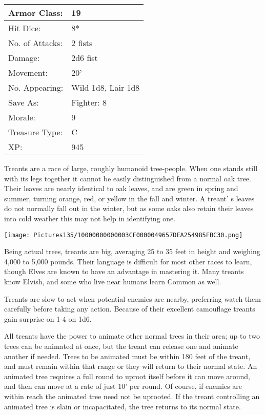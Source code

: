 \documentclass[a4paper,twoside,openany,10pt]{book}
\begin{document}
\begin{multicols}{2}
\begin{tabularx}{0.50\textwidth}{@{}lX@{}}
Armor Class: & 19 \\\hline
Hit Dice: & 8* \\\hline
No. of Attacks: & 2 fists \\\hline
Damage: & 2d6 fist \\\hline
Movement: & 20' \\\hline
No. Appearing: & Wild 1d8, Lair 1d8 \\\hline
Save As: & Fighter: 8 \\\hline
Morale: & 9 \\\hline
Treasure Type: & C \\\hline
XP: & 945 \\\hline
\end{tabularx}\medskip

Treants are a race of large, roughly humanoid tree-people. When one stands still with its legs together it cannot be easily distinguished from a normal oak tree. Their leaves are nearly identical to oak leaves, and are green in spring and summer, turning orange, red, or yellow in the fall and winter. A treant' s leaves do not normally fall out in the winter, but as some oaks also retain their leaves into cold weather this may not help in identifying one.

\begin{center} \texttt{[image: Pictures135/10000000000003CF0000049657DEA254985FBC30.png]} \end{center}

Being actual trees, treants are big, averaging 25 to 35 feet in height and weighing 4,000 to 5,000 pounds. Their language is difficult for most other races to learn, though Elves are known to have an advantage in mastering it. Many treants know Elvish, and some who live near humans learn Common as well.

Treants are slow to act when potential enemies are nearby, preferring watch them carefully before taking any action. Because of their excellent camouflage treants gain surprise on 1-4 on 1d6.

All treants have the power to animate other normal trees in their area; up to two trees can be animated at once, but the treant can release one and animate another if needed. Trees to be animated must be within 180 feet of the treant, and must remain within that range or they will return to their normal state. An animated tree requires a full round to uproot itself before it can move around, and then can move at a rate of just 10' per round. Of course, if enemies are within reach the animated tree need not be uprooted. If the treant controlling an animated tree is slain or incapacitated, the tree returns to its normal state.


\end{multicols}
\end{document}
